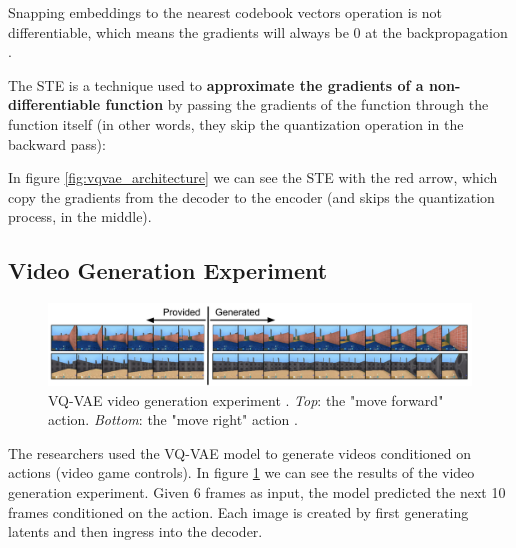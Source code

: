 Snapping embeddings to the nearest codebook vectors operation is not differentiable, which means the gradients will always be 0 at the backpropagation \cite{why_round_function_is_not_differentiable}.

The STE is a technique used to \textbf{approximate the gradients of a non-differentiable function} by passing the gradients of the function through the function itself (in other words, they skip the quantization operation in the backward pass):



In figure \ref{fig:vqvae_architecture} we can see the STE with the red arrow, which copy the gradients from the decoder to the encoder (and skips the quantization process, in the middle).






\subsection{Video Generation Experiment}

\begin{figure}[h]
    \centering
    \includegraphics[width=\textwidth]{images/vqvae_video_generation.png}
    \caption{VQ-VAE video generation experiment \cite{vqvae}. \textit{Top}: the "move forward" action. \textit{Bottom}: the "move right" action \cite{vqvae}.}
    \label{fig:vqvae_video_generation}
\end{figure}

The researchers used the VQ-VAE model to generate videos conditioned on actions (video game controls). In figure \ref{fig:vqvae_video_generation} we can see the results of the video generation experiment. Given 6 frames as input, the model predicted the next 10 frames conditioned on the action. Each image is created by first generating latents and then ingress into the decoder.
